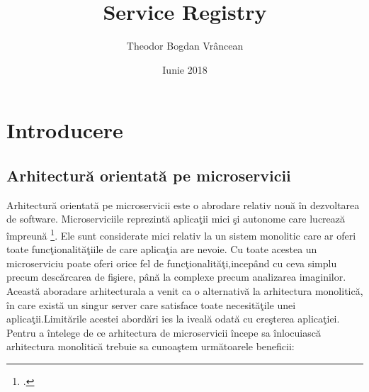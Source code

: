 \documentclass[a4paper,12pt]{report}
\title{Service Registry}
\author{Theodor Bogdan Vr\^ancean}
\date {Iunie 2018}
\begin{document}
\maketitle
\tableofcontents
\chapter{Introducere}


\section{Arhitectur\u a orientat\u a pe microservicii}

Arhitectur\u a orientat\u a pe microservicii este o abrodare relativ nou\u a \^ in dezvoltarea de software.
Microserviciile reprezint\u a aplica\c tii mici \c si autonome care lucreaz\u a \^ impreun\u a
\footcite{buildingMicroservices1}. Ele sunt considerate mici relativ la un sistem monolitic care ar
oferi toate func\c tionalit\u a\c tiile de care aplica\c tia are nevoie. Cu toate acestea un microserviciu poate oferi orice
fel de func\c tionalit\u a\c ti,incep\^and cu ceva simplu precum desc\u arcarea de fi\c siere, p\^an\u a la
complexe precum analizarea imaginilor.
Aceast\u a aboradare arhitecturala a venit ca o alternativ\u a la arhitectura monolitic\u a, \^in care exist\u a
un singur server care satisface toate necesit\u a\c tile unei aplica\c tii.Limit\u arile acestei abord\u ari ies la iveal\u a
odat\u a cu cre\c sterea aplica\c tiei.
Pentru a \^intelege de ce arhitectura  de microservicii \^incepe sa \^inlocuiasc\u a arhitectura monolitic\u a
trebuie sa cunoa\c stem urm\u atoarele beneficii:
\end{document}
